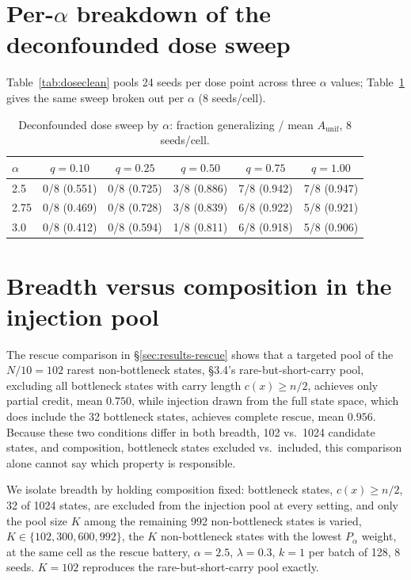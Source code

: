 \documentclass[11pt]{article}
\begin{document}
\section{Per-$\alpha$ breakdown of the deconfounded dose sweep}
\label{app:doseclean}
Table~\ref{tab:doseclean} pools 24 seeds per dose point across three $\alpha$ values; Table~\ref{tab:doseclean-peralpha} gives the same sweep broken out per $\alpha$ (8 seeds/cell).

\begin{table}[h]
\centering
\small
\caption{Deconfounded dose sweep by $\alpha$: fraction generalizing / mean $A_{\mathrm{unif}}$, 8 seeds/cell.}
\label{tab:doseclean-peralpha}
\begin{tabular}{lccccc}
\toprule
$\alpha$ & $q{=}0.10$ & $q{=}0.25$ & $q{=}0.50$ & $q{=}0.75$ & $q{=}1.00$ \\
\midrule
2.5 & 0/8 (0.551) & 0/8 (0.725) & 3/8 (0.886) & 7/8 (0.942) & 7/8 (0.947) \\
2.75 & 0/8 (0.469) & 0/8 (0.728) & 3/8 (0.839) & 6/8 (0.922) & 5/8 (0.921) \\
3.0 & 0/8 (0.412) & 0/8 (0.594) & 1/8 (0.811) & 6/8 (0.918) & 5/8 (0.906) \\
\bottomrule
\end{tabular}
\end{table}

\section{Breadth versus composition in the injection pool}
\label{app:breadth}
The rescue comparison in \S\ref{sec:results-rescue} shows that a targeted pool of the $N/10=102$ rarest non-bottleneck states, \S3.4's rare-but-short-carry pool, excluding all bottleneck states with carry length $c(x)\ge n/2$, achieves only partial credit, mean $0.750$, while injection drawn from the full state space, which does include the 32 bottleneck states, achieves complete rescue, mean $0.956$. Because these two conditions differ in both breadth, 102 vs.\ 1024 candidate states, and composition, bottleneck states excluded vs.\ included, this comparison alone cannot say which property is responsible.

We isolate breadth by holding composition fixed: bottleneck states, $c(x)\ge n/2$, 32 of 1024 states, are excluded from the injection pool at every setting, and only the pool size $K$ among the remaining 992 non-bottleneck states is varied, $K\in\{102,300,600,992\}$, the $K$ non-bottleneck states with the lowest $P_\alpha$ weight, at the same cell as the rescue battery, $\alpha=2.5$, $\lambda=0.3$, $k=1$ per batch of 128, 8 seeds. $K=102$ reproduces the rare-but-short-carry pool exactly.
\end{document}
